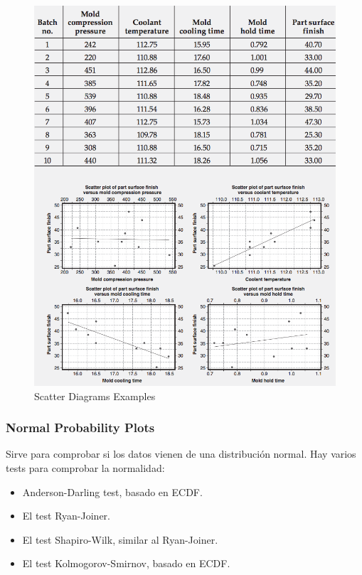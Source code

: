 \documentclass[]{article}
\begin{document}
\begin{figure}[H]
	\centering
	\includegraphics[width=150mm]{imagenes/ScatterDiagramsExamples.png}
	\caption{Scatter Diagrams Examples}
	\label{fig:ScatterDiagramsExamples}
\end{figure}

\subsubsection{Normal Probability Plots}

Sirve para comprobar si los datos vienen de una distribución normal. Hay varios tests para comprobar la normalidad:

\begin{itemize}
	\item Anderson-Darling test, basado en ECDF.
	\item El test Ryan-Joiner.
	\item El test Shapiro-Wilk, similar al Ryan-Joiner.
	\item El test Kolmogorov-Smirnov, basado en ECDF.
\end{itemize}
\end{document}
